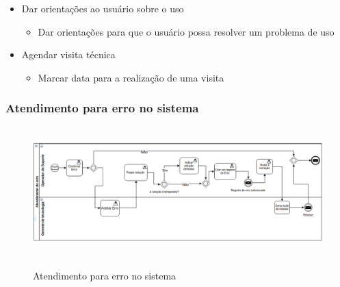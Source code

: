 \begin{itemize}[noitemsep]
	\item Dar orientações ao usuário sobre o uso
		\begin{itemize}
			\item Dar orientações para que o usuário possa resolver um problema de uso
		\end{itemize}
	\item Agendar visita técnica
		\begin{itemize}
			\item Marcar data para a realização de uma visita
		\end{itemize}
\end{itemize}

\subsubsection{Atendimento para erro no sistema}
\begin{figure}[!h]
\caption{Atendimento para erro no sistema}
\centering %
\includegraphics[width=16cm, height=5cm]{as-is/03_atendimento_de_erro.png}
\label{figura:atendimento_de_erro_as_is}
\end{figure}

